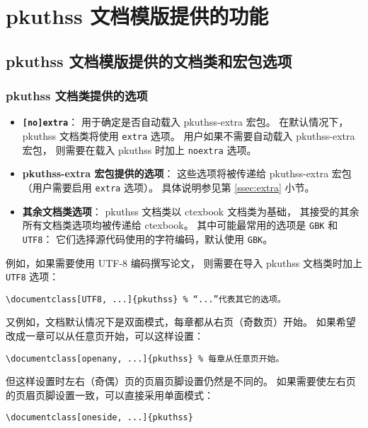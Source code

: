 %

\chapter{pkuthss 文档模版提供的功能}
	\section{pkuthss 文档模版提供的文档类和宏包选项}
		\subsection{pkuthss 文档类提供的选项}\label{ssec:options}

		\begin{itemize}
			\item \textbf{\texttt{[no]extra}}：
				用于确定是否自动载入 pkuthss-extra 宏包。
				在默认情况下，pkuthss 文档类将使用 \verb|extra| 选项。
				用户如果不需要自动载入 pkuthss-extra 宏包，
				则需要在载入 pkuthss 时加上 \verb|noextra| 选项。

			\item \textbf{pkuthss-extra 宏包提供的选项}：
				这些选项将被传递给 pkuthss-extra 宏包
				（用户需要启用 \verb|extra| 选项）。
				具体说明参见第 \ref{ssec:extra} 小节。

			\item \textbf{其余文档类选项}：%
				pkuthss 文档类以 ctexbook 文档类为基础，
				其接受的其余所有文档类选项均被传递给 ctexbook。
				其中可能最常用的选项是 \verb|GBK| 和 \verb|UTF8|：
				它们选择源代码使用的字符编码，默认使用 \verb|GBK|。
		\end{itemize}

		例如，如果需要使用 UTF-8 编码撰写论文，
		则需要在导入 pkuthss 文档类时加上 \verb|UTF8| 选项：
\begin{Verbatim}[frame = single]
\documentclass[UTF8, ...]{pkuthss} % “...”代表其它的选项。
\end{Verbatim}

		又例如，文档默认情况下是双面模式，每章都从右页（奇数页）开始。
		如果希望改成一章可以从任意页开始，可以这样设置：
\begin{Verbatim}[frame = single]
\documentclass[openany, ...]{pkuthss} % 每章从任意页开始。
\end{Verbatim}
		但这样设置时左右（奇偶）页的页眉页脚设置仍然是不同的。
		如果需要使左右页的页眉页脚设置一致，可以直接采用单面模式：
\begin{Verbatim}[frame = single]
% 使用 oneside 选项时不需要再指定 openany 选项。
\documentclass[oneside, ...]{pkuthss}
\end{Verbatim}

